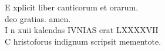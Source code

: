 \documentclass[letter,12pt]{book}
\newcommand*\zallmancaps{\usefont{U}{Zallman}{xl}{n}}
\begin{document}
\begin{center} \color{Red}
\mdseries \large E\color{black} xplicit liber canticorum et orarum. \\
deo gratias. amen. \\
\color{Red} I\color{black} n xuii kalendas IVNIAS erat LXXXXVII \\%
\color{Red} C\color{black} hristoforus indignum scripsit mementote.
\end{center}




\end{document}
